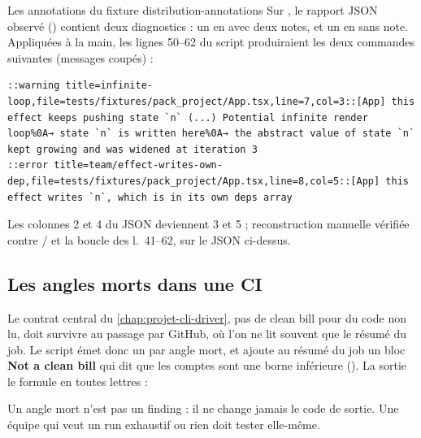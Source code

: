 \begin{exemple}{Les annotations du fixture }{distribution-annotations}
Sur , le rapport JSON observé () contient deux diagnostics : un \Warning{}  en  avec deux notes, et un \Error{}  en  sans note. Appliquées à la main, les lignes 50--62 du script produiraient les deux commandes suivantes (messages coupés) :
\begin{lstlisting}[language={},caption={Annotations reconstituées à la main à partir de \file{scripts/gh-action.mjs} (non exécuté, élagué)}]
::warning title=infinite-loop,file=tests/fixtures/pack_project/App.tsx,line=7,col=3::[App] this effect keeps pushing state `n` (...) Potential infinite render loop%0A→ state `n` is written here%0A→ the abstract value of state `n` kept growing and was widened at iteration 3
::error title=team/effect-writes-own-dep,file=tests/fixtures/pack_project/App.tsx,line=8,col=5::[App] this effect writes `n`, which is in its own deps array
\end{lstlisting}
Les colonnes 2 et 4 du JSON deviennent 3 et 5 ; reconstruction manuelle vérifiée contre / et la boucle des l.~41--62, sur le JSON ci-dessus.
\end{exemple}

\subsection{Les angles morts dans une CI}

Le contrat central du \cref{chap:projet-cli-driver}, pas de \og clean bill\fg{} pour du code non lu, doit survivre au passage par GitHub, où l'on ne lit souvent que le résumé du job. Le script émet donc un  par angle mort, et ajoute au résumé du job un bloc \og \textbf{Not a clean bill}\fg{} qui dit que les comptes sont une borne inférieure (). La sortie  le formule en toutes lettres :


Un angle mort n'est pas un finding : il ne change jamais le code de sortie. Une équipe qui veut un run exhaustif ou rien doit tester  elle-même.

